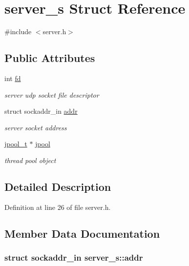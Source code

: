 \hypertarget{structserver__s}{\section{server\-\_\-s Struct Reference}
\label{structserver__s}
}


{\ttfamily \#include $<$server.\-h$>$}

\subsection*{Public Attributes}
\begin{DoxyCompactItemize}
\item 
int \hyperlink{structserver__s_a6129acbc6b313f77efeb488754f559ec}{fd}
\begin{DoxyCompactList}\small\item\em server udp socket file descriptor \end{DoxyCompactList}\item 
struct sockaddr\-\_\-in \hyperlink{structserver__s_a09fe17ff633d4d26a4080d46749c1fe3}{addr}
\begin{DoxyCompactList}\small\item\em server socket address \end{DoxyCompactList}\item 
\hyperlink{structjpool__t}{jpool\-\_\-t} $\ast$ \hyperlink{structserver__s_ac45d9f57c1cf8b4841843284d319072b}{jpool}
\begin{DoxyCompactList}\small\item\em thread pool object \end{DoxyCompactList}\end{DoxyCompactItemize}


\subsection{Detailed Description}


Definition at line 26 of file server.\-h.



\subsection{Member Data Documentation}
\hypertarget{structserver__s_a09fe17ff633d4d26a4080d46749c1fe3}{
\subsubsection[{addr}]{\setlength{\rightskip}{0pt plus 5cm}struct sockaddr\-\_\-in server\-\_\-s\-::addr}}\label{structserver__s_a09fe17ff633d4d26a4080d46749c1fe3}



